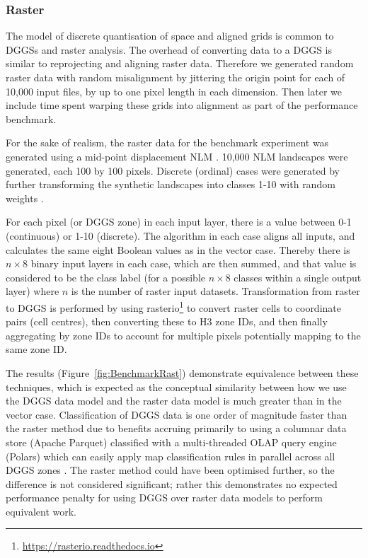 \documentclass[]{interact}
\theoremstyle{plain}%
\theoremstyle{definition}
\theoremstyle{remark}
\begin{document}
\subsubsection{Raster}

The model of discrete quantisation of space and aligned grids is common to \acp{DGGS} and raster analysis. The overhead of converting data to a \ac{DGGS} is similar to reprojecting and aligning raster data. Therefore we generated random raster data with random misalignment by jittering the origin point for each of 10,000 input files, by up to one pixel length in each dimension. Then later we include time spent warping these grids into alignment as part of the performance benchmark.

For the sake of realism, the raster data for the benchmark experiment was generated using a mid-point displacement \ac{NLM} \citep{etherington2015nlm}. 10,000 \ac{NLM} landscapes were generated, each 100 by 100 pixels. Discrete (ordinal) cases were generated by further transforming the synthetic landscapes into classes 1-10 with random weights \citep{etherington2015nlm}.

For each pixel (or \ac{DGGS} zone) in each input layer, there is a value between 0-1 (continuous) or 1-10 (discrete). The algorithm in each case aligns all inputs, and calculates the same eight Boolean values as in the vector case. Thereby there is $n\times8$ binary input layers in each case, which are then summed, and that value is considered to be the class label (for a possible $n\times8$ classes within a single output layer) where $n$ is the number of raster input datasets. Transformation from raster to \ac{DGGS} is performed by using rasterio\footnote{\url{https://rasterio.readthedocs.io}} to convert raster cells to coordinate pairs (cell centres), then converting these to H3 zone IDs, and then finally aggregating by zone IDs to account for multiple pixels potentially mapping to the same zone ID.

The results (Figure~\ref{fig:BenchmarkRast}) demonstrate equivalence between these techniques, which is expected as the conceptual similarity between how we use the \ac{DGGS} data model and the raster data model is much greater than in the vector case. Classification of \ac{DGGS} data is one order of magnitude faster than the raster method due to benefits accruing primarily to using a columnar data store (Apache Parquet) classified with a multi-threaded \ac{OLAP} query engine (Polars) which can easily apply map classification rules in parallel across all \ac{DGGS} zones \citep{polars}. The raster method could have been optimised further, so the difference is not considered significant; rather this demonstrates no expected performance penalty for using \ac{DGGS} over raster data models to perform equivalent work.
\end{document}
